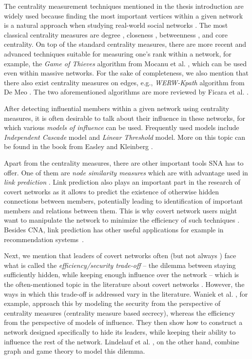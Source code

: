 The centrality measurement techniques mentioned in the thesis introduction are widely used because
finding the most important vertices within a given network is a natural approach when
studying real-world social networks \cite{Crescenzi2016}.
The most classical centrality measures are degree \cite{Shaw1954}, closeness \cite{Beauchamp1965},
betweenness \cite{Anthonisse1971,Freeman1977}, and core \cite{Seidman1983} centrality.
On top of the standard centrality measures, there are more recent and advanced techniques suitable for measuring one's rank within a network,
for example, the \emph{Game of Thieves} algorithm from Mocanu et al. \cite{Mocanu2018}, which can be used even within massive networks.
For the sake of completeness, we also mention that there also exist centrality measures on edges, e.g.,
\emph{WERW-Kpath} algorithm from {De Meo} \cite{DeMeo2013}.
The two aforementioned algorithms are more reviewed by Ficara et al. \cite{Ficara2021}.

After detecting influential members within a given network using centrality measures,
it is often desirable to talk about their influence in these networks, for which
various \emph{models of influence} can be used.
Frequently used models include \emph{Independent Cascade} model and \emph{Linear Threshold} model.
More on this topic can be found in the book from Easley and Kleinberg \cite{Easley2010}.

Apart from the centrality measures, there are other important tools SNA has to offer.
One of them are \emph{node similarity measures} which are with advantage used in \emph{link prediction} \cite{Zhou2009,Wang2015}.
Link prediction also plays an important part in the research of covert networks
as it allows to predict the existence of otherwise hidden connections between members, potentially leading to
identification of important members and relations between them.
This is why covert network users might want to manipulate the network to minimize the efficiency of such techniques \cite{Zhou2019}.
Besides CNA, link prediction has other useful applications for example in recommendation systems~\cite{Huang2005,Talasu2017}.

Next, we mention that leaders of covert networks often (but not always \cite{Fatih2012}) face what is called
the \emph{efficiency/security trade-off} \cite{Morselli2007} --
the dilemma between staying sufficiently hidden, while keeping enough influence over the network --
which is the often-mentioned topic in the literature about covert networks \cite{Waniek2017,Lindelauf2009,Crossley2012}.
However, the ways in which this trade-off is addressed vary in the literature.
Waniek et al. \cite{Waniek2017}, for example, approach this by modeling the security from the perspective of
centrality measures (centrality measure based secrecy), whereas the efficiency from the perspective of models of influence.
They then show how to construct a network designed specifically to hide its leaders, while
keeping their ability to influence the rest of the network.
Lindelauf et al. \cite{Lindelauf2009}, on the other hand, combine graph and game theory to model this dilemma.

